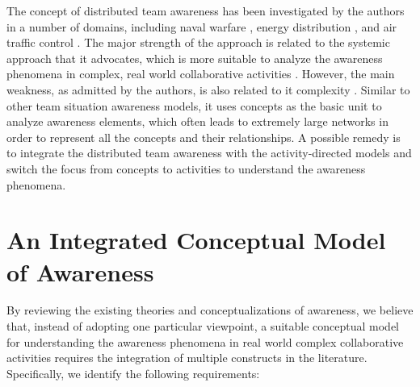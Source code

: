 The concept of distributed team awareness has been investigated by the authors in a number of domains, including naval warfare \cite{Stanton2006}, energy distribution \cite{Salmon2008a}, and air traffic control \cite{Stanton2009}. The major strength of the approach is related to the systemic approach that it advocates, which is more suitable to analyze the awareness phenomena in complex, real world collaborative activities \cite{Stanton2009}. However, the main weakness, as admitted by the authors, is also related to it complexity \cite{Salmon2010}. Similar to other team situation awareness models, it uses concepts as the basic unit to analyze awareness elements, which often leads to extremely large networks in order to represent all the concepts and their relationships. A possible remedy is to integrate the distributed team awareness with the activity-directed models and switch the focus from concepts to activities to understand the awareness phenomena.


\section{An Integrated Conceptual Model of Awareness} %
\label{sec:discussion}
By reviewing the existing theories and conceptualizations of awareness, we believe that, instead of adopting one particular viewpoint, a suitable conceptual model for understanding the awareness phenomena in real world complex collaborative activities requires the integration of multiple constructs in the literature. Specifically, we identify the following requirements:


